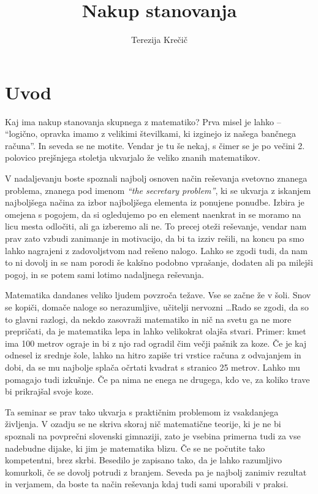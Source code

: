 \documentclass[a4paper, 12pt, titlepage]{article}
\author{Terezija Krečič}
\title{Nakup stanovanja}
\begin{document}
\maketitle
\tableofcontents
\newpage

\section{Uvod}

Kaj ima nakup stanovanja skupnega z matematiko? Prva misel je lahko -- ``logično, opravka imamo z velikimi številkami, ki izginejo iz našega bančnega računa''. In seveda se ne motite. Vendar je tu še nekaj, s čimer se je po večini 2. polovico prejšnjega stoletja ukvarjalo že veliko znanih matematikov.

V nadaljevanju boste spoznali najbolj osnoven način reševanja svetovno znanega problema, znanega pod imenom \emph{``the secretary problem''}, ki se ukvarja z iskanjem najboljšega načina za izbor najboljšega elementa iz ponujene ponudbe. Izbira je omejena s pogojem, da si ogledujemo po en element naenkrat in se moramo na licu mesta odločiti, ali ga izberemo ali ne. To precej oteži reševanje, vendar nam prav zato vzbudi zanimanje in motivacijo, da bi ta izziv rešili, na koncu pa smo lahko nagrajeni z zadovoljstvom nad rešeno nalogo. Lahko se zgodi tudi, da nam to ni dovolj in se nam porodi še kakšno podobno vprašanje, dodaten ali pa milejši pogoj, in se potem sami lotimo nadaljnega reševanja.

Matematika dandanes veliko ljudem povzroča težave. Vse se začne že v šoli. Snov se kopiči, domače naloge so nerazumljive, učitelji nervozni \ldots Rado se zgodi, da so to glavni razlogi, da nekdo zasovraži matematiko in nič na svetu ga ne more prepričati, da je matematika lepa in lahko velikokrat olajša stvari. Primer: kmet ima 100 metrov ograje in bi z njo rad ogradil čim večji pašnik za koze. Če je kaj odnesel iz srednje šole, lahko na hitro zapiše tri vrstice računa z odvajanjem in dobi, da se mu najbolje splača očrtati kvadrat s stranico 25 metrov. Lahko mu pomagajo tudi izkušnje. Če pa nima ne enega ne drugega, kdo ve, za koliko trave bi prikrajšal svoje koze.

Ta seminar se prav tako ukvarja s praktičnim problemom iz vsakdanjega življenja. V ozadju se ne skriva skoraj nič matematične teorije, ki je ne bi spoznali na povprečni slovenski gimnaziji, zato je vsebina primerna tudi za vse nadebudne dijake, ki jim je matematika blizu. Če se ne počutite tako kompetentni, brez skrbi. Besedilo je zapisano tako, da je lahko razumljivo komurkoli, če se dovolj potrudi z branjem. Seveda pa je najbolj zanimiv rezultat in verjamem, da boste ta način reševanja kdaj tudi sami uporabili v praksi.
\end{document}
